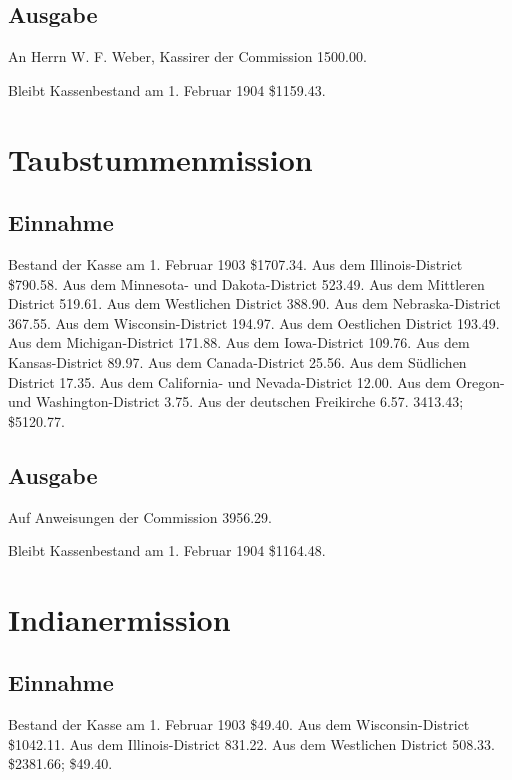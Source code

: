 \subsection{Ausgabe}

An Herrn W. F. Weber, Kassirer der Commission 1500.00.

Bleibt Kassenbestand am 1. Februar 1904 \$1159.43.

\section{Taubstummenmission}

\subsection{Einnahme}

Bestand der Kasse am 1. Februar 1903 \$1707.34. Aus dem Illinois-District \$790.58. Aus dem Minnesota- und Dakota-District 523.49. Aus dem Mittleren District 519.61. Aus dem Westlichen District 388.90. Aus dem Nebraska-District 367.55. Aus dem Wisconsin-District 194.97. Aus dem Oestlichen District 193.49. Aus dem Michigan-District 171.88. Aus dem Iowa-District 109.76. Aus dem Kansas-District 89.97. Aus dem Canada-District 25.56. Aus dem Südlichen District 17.35. Aus dem California- und Nevada-District 12.00. Aus dem Oregon- und Washington-District 3.75. Aus der deutschen Freikirche 6.57. 3413.43; \$5120.77.

\subsection{Ausgabe}

Auf Anweisungen der Commission 3956.29.

Bleibt Kassenbestand am 1. Februar 1904 \$1164.48.

\section{Indianermission}

\subsection{Einnahme}

Bestand der Kasse am 1. Februar 1903 \$49.40. Aus dem Wisconsin-District \$1042.11. Aus dem Illinois-District 831.22. Aus dem Westlichen District 508.33. \$2381.66; \$49.40.


